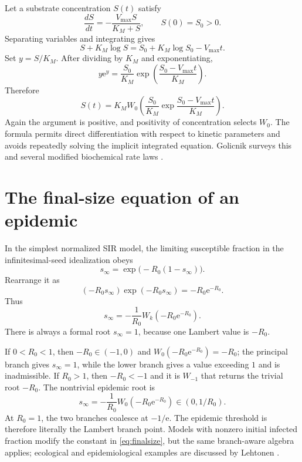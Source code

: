 \documentclass[11pt,oneside]{book}
\theoremstyle{definition}
\theoremstyle{remark}
\newcommand{\ee}{\mathrm e}
\begin{document}
Let a substrate concentration $S(t)$ satisfy
\begin{equation}\label{eq:mmode}
 \frac{dS}{dt}=-\frac{V_{\max}S}{K_M+S},
 \qquad S(0)=S_0>0.
\end{equation}
Separating variables and integrating gives
\begin{equation}\label{eq:mmintegrated}
 S+K_M\log S
 =S_0+K_M\log S_0-V_{\max}t.
\end{equation}
Set $y=S/K_M$.  After dividing by $K_M$ and exponentiating,
\[
 y\ee^y
 =\frac{S_0}{K_M}
 \exp\!\left(\frac{S_0-V_{\max}t}{K_M}\right).
\]
Therefore
\begin{equation}\label{eq:mmsolution}
 \boxed{
 S(t)=K_M W_0\!\left(
 \frac{S_0}{K_M}
 \exp\!\frac{S_0-V_{\max}t}{K_M}
 \right).}
\end{equation}
Again the argument is positive, and positivity of concentration selects
$W_0$.  The formula permits direct differentiation with respect to kinetic
parameters and avoids repeatedly solving the implicit integrated equation.
Golicnik surveys this and several modified biochemical rate laws
\cite{golicnik2012}.

\section{The final-size equation of an epidemic}

In the simplest normalized SIR model, the limiting susceptible fraction in
the infinitesimal-seed idealization obeys
\begin{equation}\label{eq:finalsize}
 s_\infty=\exp\bigl(-R_0(1-s_\infty)\bigr).
\end{equation}
Rearrange it as
\[
 (-R_0s_\infty)\exp(-R_0s_\infty)
 =-R_0\ee^{-R_0}.
\]
Thus
\begin{equation}\label{eq:finalsizeW}
 s_\infty=-\frac1{R_0}
 W_k(-R_0\ee^{-R_0}).
\end{equation}
There is always a formal root $s_\infty=1$, because one Lambert value is
$-R_0$.

If $0<R_0<1$, then $-R_0\in(-1,0)$ and
$W_0(-R_0\ee^{-R_0})=-R_0$; the principal branch gives $s_\infty=1$, while
the lower branch gives a value exceeding $1$ and is inadmissible.  If
$R_0>1$, then $-R_0<-1$ and it is $W_{-1}$ that returns the trivial root
$-R_0$.  The nontrivial epidemic root is
\begin{equation}\label{eq:finalsizephysical}
 \boxed{
 s_\infty=-\frac1{R_0}W_0(-R_0\ee^{-R_0})
 \in(0,1/R_0).}
\end{equation}
At $R_0=1$, the two branches coalesce at $-1/\ee$.  The epidemic threshold is
therefore literally the Lambert branch point.  Models with nonzero initial
infected fraction modify the constant in \eqref{eq:finalsize}, but the same
branch-aware algebra applies; ecological and epidemiological examples are
discussed by Lehtonen \cite{lehtonen2016}.
\end{document}
